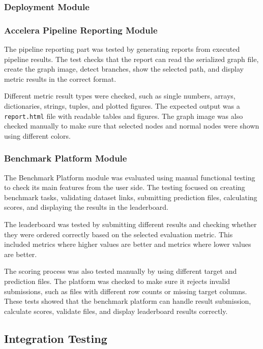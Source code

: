 \documentclass[12pt,a4paper]{report}
\begin{document}
\subsubsection{Deployment Module}


\subsubsection{Accelera Pipeline Reporting Module}

The pipeline reporting part was tested by generating reports from executed
pipeline results. The test checks that the report can read the serialized graph
file, create the graph image, detect branches, show the selected path, and
display metric results in the correct format.

Different metric result types were checked, such as single numbers, arrays,
dictionaries, strings, tuples, and plotted figures. The expected output was a
\texttt{report.html} file with readable tables and figures. The graph image was
also checked manually to make sure that selected nodes and normal nodes were
shown using different colors.

\subsubsection{Benchmark Platform Module}

The Benchmark Platform module was evaluated using manual functional testing to check its main features from the user side. The testing focused on creating benchmark tasks, validating dataset links, submitting prediction files, calculating scores, and displaying the results in the leaderboard.

\noindent The leaderboard was tested by submitting different results and checking whether they were ordered correctly based on the selected evaluation metric. This included metrics where higher values are better and metrics where lower values are better.

\noindent The scoring process was also tested manually by using different target and prediction files. The platform was checked to make sure it rejects invalid submissions, such as files with different row counts or missing target columns. These tests showed that the benchmark platform can handle result submission, calculate scores, validate files, and display leaderboard results correctly.

\subsection{Integration Testing}
\end{document}
